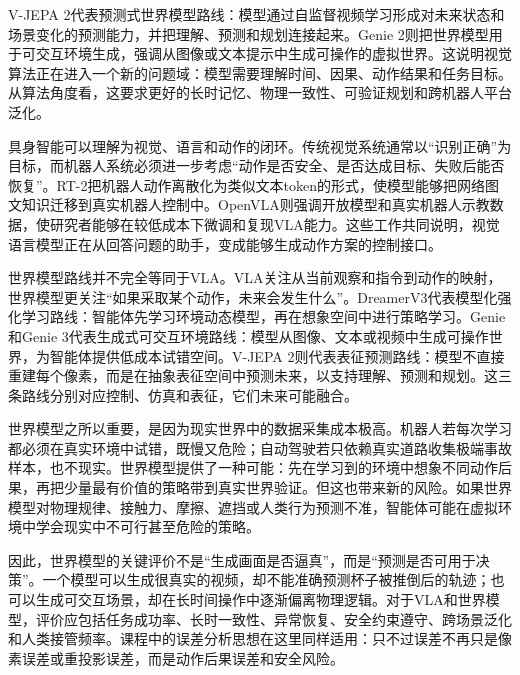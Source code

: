 \documentclass[UTF8,a4paper,12pt]{ctexart}
\newcommand{\model}[1]{\textsf{#1}}
\begin{document}
\model{V-JEPA 2}代表预测式世界模型路线：模型通过自监督视频学习形成对未来状态和场景变化的预测能力，并把理解、预测和规划连接起来\cite{vjepa2}。\model{Genie 2}则把世界模型用于可交互环境生成，强调从图像或文本提示中生成可操作的虚拟世界\cite{genie2}。这说明视觉算法正在进入一个新的问题域：模型需要理解时间、因果、动作结果和任务目标。从算法角度看，这要求更好的长时记忆、物理一致性、可验证规划和跨机器人平台泛化。

具身智能可以理解为视觉、语言和动作的闭环。传统视觉系统通常以“识别正确”为目标，而机器人系统必须进一步考虑“动作是否安全、是否达成目标、失败后能否恢复”。\model{RT-2}把机器人动作离散化为类似文本token的形式，使模型能够把网络图文知识迁移到真实机器人控制中\cite{rt2}。\model{OpenVLA}则强调开放模型和真实机器人示教数据，使研究者能够在较低成本下微调和复现VLA能力\cite{openvla}。这些工作共同说明，视觉语言模型正在从回答问题的助手，变成能够生成动作方案的控制接口。

世界模型路线并不完全等同于VLA。VLA关注从当前观察和指令到动作的映射，世界模型更关注“如果采取某个动作，未来会发生什么”。\model{DreamerV3}代表模型化强化学习路线：智能体先学习环境动态模型，再在想象空间中进行策略学习\cite{dreamerv3}。\model{Genie}和\model{Genie 3}代表生成式可交互环境路线：模型从图像、文本或视频中生成可操作世界，为智能体提供低成本试错空间\cite{genie,genie3}。\model{V-JEPA 2}则代表表征预测路线：模型不直接重建每个像素，而是在抽象表征空间中预测未来，以支持理解、预测和规划\cite{vjepa2}。这三条路线分别对应控制、仿真和表征，它们未来可能融合。

世界模型之所以重要，是因为现实世界中的数据采集成本极高。机器人若每次学习都必须在真实环境中试错，既慢又危险；自动驾驶若只依赖真实道路收集极端事故样本，也不现实。世界模型提供了一种可能：先在学习到的环境中想象不同动作后果，再把少量最有价值的策略带到真实世界验证。但这也带来新的风险。如果世界模型对物理规律、接触力、摩擦、遮挡或人类行为预测不准，智能体可能在虚拟环境中学会现实中不可行甚至危险的策略。

因此，世界模型的关键评价不是“生成画面是否逼真”，而是“预测是否可用于决策”。一个模型可以生成很真实的视频，却不能准确预测杯子被推倒后的轨迹；也可以生成可交互场景，却在长时间操作中逐渐偏离物理逻辑。对于VLA和世界模型，评价应包括任务成功率、长时一致性、异常恢复、安全约束遵守、跨场景泛化和人类接管频率。课程中的误差分析思想在这里同样适用：只不过误差不再只是像素误差或重投影误差，而是动作后果误差和安全风险。
\end{document}
